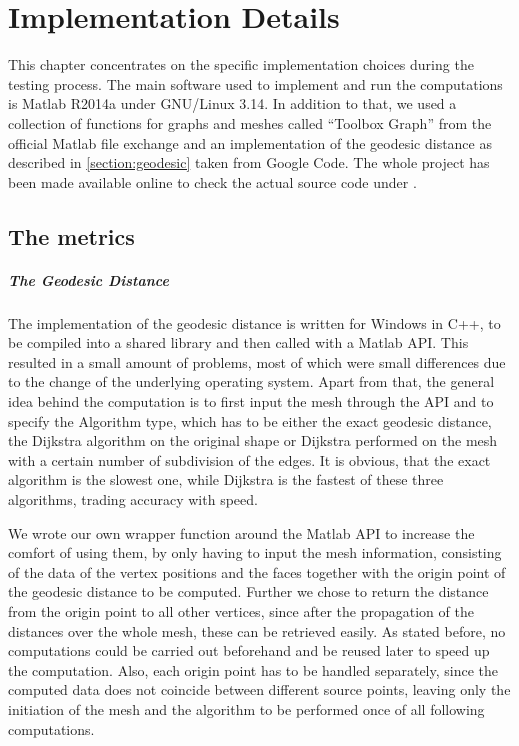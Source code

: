 \chapter{Implementation Details}
\label{chapter:implementation}

This chapter concentrates on the specific implementation choices during the testing process.
The main software used to implement and  run the computations is Matlab R2014a under GNU/Linux 3.14.
In addition to that, we used a collection of functions for graphs and meshes called ``Toolbox Graph'' from the official Matlab file exchange\cite{online_toolbox} and an implementation of the geodesic distance as described in \ref{section:geodesic} taken from Google Code\cite{online_geodesic}.
The whole project has been made available online to check the actual source code under \cite{online_github}.

\section{The metrics}
\paragraph{The Geodesic Distance}
The implementation of the geodesic distance is written for Windows in C++, to be compiled into a shared library and then called with a Matlab API.
This resulted in a small amount of problems, most of which were small differences due to the change of the underlying operating system.
Apart from that, the general idea behind the computation is to first input the mesh through the API and to specify the Algorithm type, which has to be either the exact geodesic distance, the Dijkstra algorithm on the original shape or Dijkstra performed on the mesh with a certain number of subdivision of the edges.
It is obvious, that the exact algorithm is the slowest one, while Dijkstra is the fastest of these three algorithms, trading accuracy with speed.

We wrote our own wrapper function around the Matlab API to increase the comfort of using them, by only having to input the mesh information, consisting of the data of the vertex positions and the faces together with the origin point of the geodesic distance to be computed.
Further we chose to return the distance from the origin point to all other vertices, since after the propagation of the distances over the whole mesh, these can be retrieved easily.
As stated before, no computations could be carried out beforehand and be reused later to speed up the computation.
Also, each origin point has to be handled separately, since the computed data does not coincide between different source points, leaving only the initiation of the mesh and the algorithm to be performed once of all following computations.

